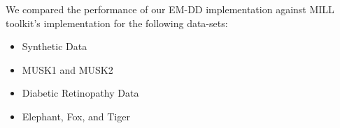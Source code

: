 \documentclass[conference]{IEEEtran}
\begin{document}
\begin{table}[t]
\centering
\caption{Accuracy, Precision, Recall for Python EM-DD implementation on all data-sets, tested over the entire set}
\label{em-dd-accuracy-precision-recall-full}
\end{table}


We compared the performance of our EM-DD implementation against MILL toolkit's implementation for the following data-sets:
\begin{itemize}
    \item Synthetic Data\cite{SynthDataset}
    \item MUSK1\cite{MUSK1Dataset} and MUSK2\cite{MUSK2Dataset}
    \item Diabetic Retinopathy Data\cite{SynthDataset}
    \item Elephant, Fox, and Tiger\cite{andrews2002support}
\end{itemize}
\end{document}
